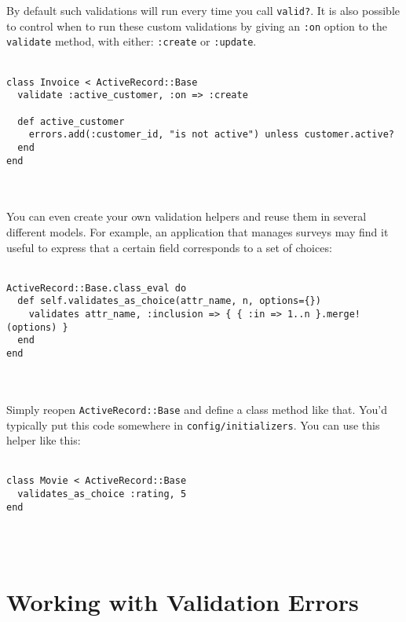 \documentclass[10pt]{book}
\begin{document}
By default such validations will run every time you call \texttt{valid?}. It is also possible to control when to run these custom validations by giving an \texttt{:on} option to the \texttt{validate} method, with either: \texttt{:create} or \texttt{:update}.
\\ \\
\begin{minipage}{\textwidth}{\scriptsize
\begin{verbatim}
class Invoice < ActiveRecord::Base
  validate :active_customer, :on => :create
 
  def active_customer
    errors.add(:customer_id, "is not active") unless customer.active?
  end
end
\end{verbatim}}
\end{minipage}
\\ \\

You can even create your own validation helpers and reuse them in  several different models. For example, an application that manages  surveys may find it useful to express that a certain field corresponds  to a set of choices:
\\ \\
\begin{minipage}{\textwidth}{\scriptsize
\begin{verbatim}
ActiveRecord::Base.class_eval do
  def self.validates_as_choice(attr_name, n, options={})
    validates attr_name, :inclusion => { { :in => 1..n }.merge!(options) }
  end
end
\end{verbatim}}
\end{minipage}
\\ \\

Simply reopen \texttt{ActiveRecord::Base} and define a class method like that. You’d typically put this code somewhere in \texttt{config/initializers}. You can use this helper like this:
\\ \\
\begin{minipage}{\textwidth}{\scriptsize
\begin{verbatim}
class Movie < ActiveRecord::Base
  validates_as_choice :rating, 5
end
\end{verbatim}}
\end{minipage}
\\ \\

\section{ Working with Validation Errors}
\end{document}
